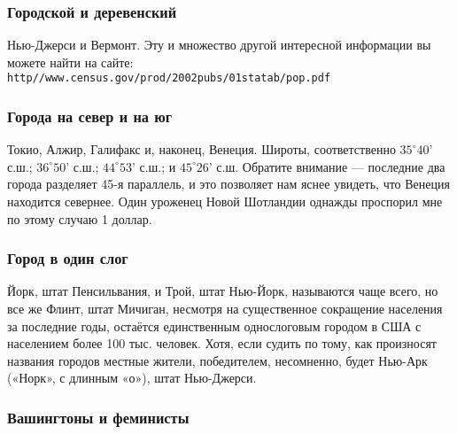 \subsubsection*{Городской и деревенский}%


Нью-Джерси и Вермонт. Эту и множество другой интересной информации вы можете найти на сайте:\\
\texttt{http//www.census.gov/prod/2002pubs/01statab/pop.pdf} 
 \heart                                                                                                      




\subsubsection*{Города на север и на юг}%


Токио, Алжир, Галифакс и, наконец, Венеция. Широты, соответственно
$35^\circ 40’$ с.ш.;  $36^\circ 50’$ с.ш.; $44^\circ 53’$ с.ш.; и $45^\circ 26’$ с.ш. 
Обратите внимание --- последние два города разделяет 45-я параллель, и это позволяет нам яснее увидеть, что Венеция находится севернее. Один уроженец Новой Шотландии однажды проспорил мне по этому случаю 1 доллар.\heart




\subsubsection*{Город в один слог}%


Йорк, штат Пенсильвания, и Трой, штат Нью-Йорк, называются чаще всего, но все же Флинт, штат Мичиган, несмотря на существенное сокращение населения за последние годы, остаётся единственным однослоговым городом в США с населением более 100 тыс. человек.  Хотя, если судить по тому, как произносят названия городов местные жители, победителем, несомненно, будет Нью-Арк («Норк», с длинным «о»),  штат Нью-Джерси. \heart






\subsubsection*{Вашингтоны и феминисты}%


